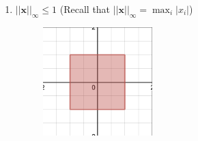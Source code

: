 \documentclass[a4paper]{article}
\theoremstyle{definition}
\newenvironment{soln}{
    \leavevmode\color{blue}\ignorespaces
}{}
\begin{document}
\begin{enumerate}
\begin{soln}
\begin{figure}[H]
	        \captionsetup{labelformat=empty}
	        \caption{}
	        \label{fig:my_label}
	    \end{figure}
	\end{soln}
	\item 	$||\mathbf{x}||_\infty \leq 1$ (Recall that $||\mathbf{x}||_\infty = \max_i |x_i|$)         
	\begin{soln}
	    \begin{figure}[H]
	        \centering
	        \includegraphics[width=0.4\textwidth]{333.png}
	        \captionsetup{labelformat=empty}
	        \caption{}
	        \label{fig:my_label}
	    \end{figure}
	\end{soln}

\end{enumerate}
\end{document}
